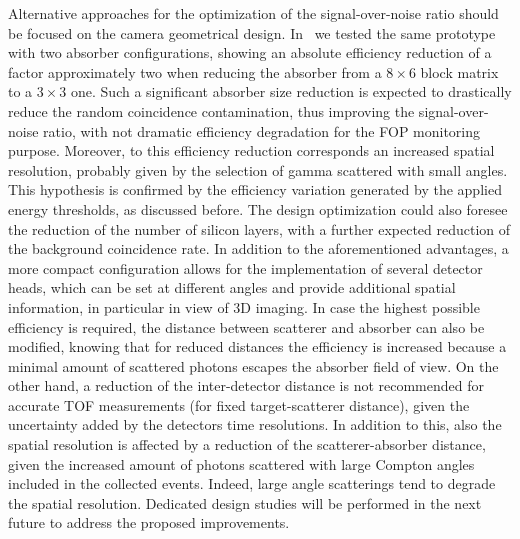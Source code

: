 Alternative approaches for the optimization of the signal-over-noise ratio should be focused on the camera geometrical design. In~\cite{Fontana_APPB} we tested the same prototype with two absorber configurations, showing an absolute efficiency reduction of a factor approximately two when reducing the absorber from a $8\times6$ block matrix to a $3\times3$ one. Such a significant absorber size reduction is expected to drastically reduce the random coincidence contamination, thus improving the signal-over-noise ratio, with not dramatic efficiency degradation for the FOP monitoring purpose. Moreover, to this efficiency reduction corresponds an increased spatial resolution, probably given by the selection of gamma scattered with small angles. This hypothesis is confirmed by the efficiency variation generated by the applied energy thresholds, as discussed before. 
The design optimization could also foresee the reduction of the number of silicon layers, with a further expected reduction of the background coincidence rate. In addition to the aforementioned advantages, a more compact configuration allows for the implementation of several detector heads, which can be set at different angles and provide additional spatial information, in particular in view of 3D imaging. In case the highest possible efficiency is required, the distance between scatterer and absorber can also be modified, knowing that for reduced distances the efficiency is increased because a minimal amount of scattered photons escapes the absorber field of view. On the other hand, a reduction of the inter-detector distance is not recommended for accurate TOF measurements (for fixed target-scatterer distance), given the uncertainty added by the detectors time resolutions. In addition to this, also the spatial resolution is affected by a reduction of the scatterer-absorber distance, given the increased amount of photons scattered with large Compton angles included in the collected events. Indeed, large angle scatterings tend to degrade the spatial resolution. Dedicated design studies will be performed in the next future to address the proposed improvements.  

